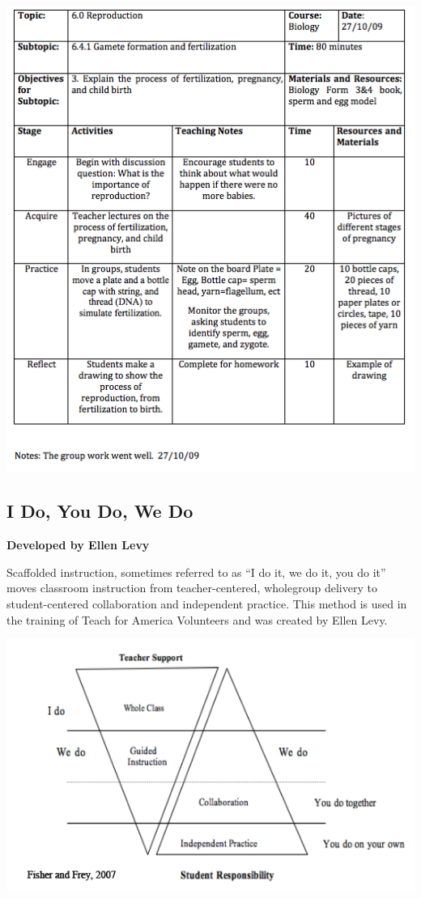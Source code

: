\begin{center}
\includegraphics[scale=1]{./img/picture-5.png} 
\end{center}

\newpage
\begin{center}
\section{I Do, You Do, We Do}
\textbf{Developed by Ellen Levy}\\
\end{center}

Scaffolded instruction, sometimes referred to as ``I do it, we do it, you do it'' moves classroom instruction from teacher-centered, wholegroup delivery to student-centered collaboration and independent practice.  This method is used in the training of Teach for America Volunteers and was created by Ellen Levy. \\

\begin{center}
\includegraphics[scale=0.7]{./img/i-do-you-do-triangle.png} 
\end{center}

